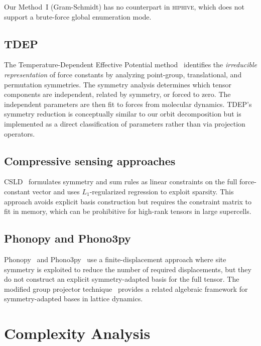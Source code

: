 \documentclass[twocolumn,amsmath,amssymb,aps,prb,10pt,floatfix]{revtex4-2}
\begin{document}
Our Method~I (Gram-Schmidt) has no counterpart in \textsc{hiphive}, which does not support a brute-force global enumeration mode.

\subsection{\textsc{TDEP}}

The Temperature-Dependent Effective Potential method~\cite{Hellman2011,Hellman2013,Hellman2013cubic,Knoop2024tdep} identifies the \emph{irreducible representation} of force constants by analyzing point-group, translational, and permutation symmetries.
The symmetry analysis determines which tensor components are independent, related by symmetry, or forced to zero.
The independent parameters are then fit to forces from molecular dynamics.
TDEP's symmetry reduction is conceptually similar to our orbit decomposition but is implemented as a direct classification of parameters rather than via projection operators.

\subsection{Compressive sensing approaches}

CSLD~\cite{Zhou2019csld} formulates symmetry and sum rules as linear constraints on the full force-constant vector and uses $L_1$-regularized regression to exploit sparsity. This approach avoids explicit basis construction but requires the constraint matrix to fit in memory, which can be prohibitive for high-rank tensors in large supercells.

\subsection{Phonopy and Phono3py}

Phonopy~\cite{Togo2015phonopy,Togo2023phonopy} and Phono3py~\cite{Togo2015phono3py,Togo2023implementation} use a finite-displacement approach where site symmetry is exploited to reduce the number of required displacements, but they do not construct an explicit symmetry-adapted basis for the full tensor.
The modified group projector technique~\cite{Damnjanovic2015} provides a related algebraic framework for symmetry-adapted bases in lattice dynamics.


\section{Complexity Analysis}
\label{sec:scaling}
\end{document}
